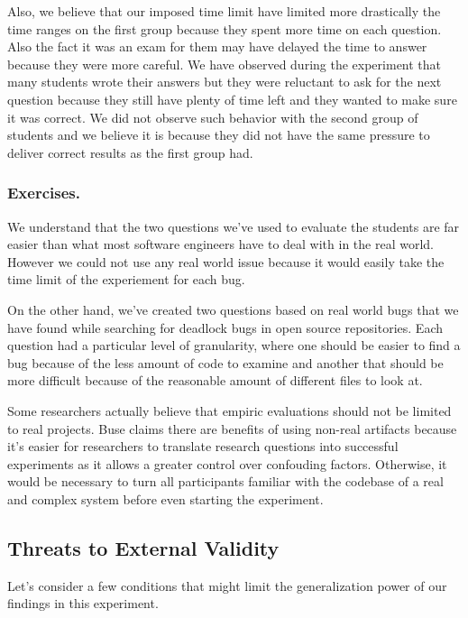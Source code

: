 Also, we believe that our imposed time limit have limited more drastically the time ranges on the first group because they spent more time on each question. Also the fact it was an exam for them may have delayed the time to answer because they were more careful. We have observed during the experiment that many students wrote their answers but they were reluctant to ask for the next question because they still have plenty of time left and they wanted to make sure it was correct. We did not observe such behavior with the second group of students and we believe it is because they did not have the same pressure to deliver correct results as the first group had.

\subsubsection{Exercises.}

We understand that the two questions we've used to evaluate the students are far easier than what most software engineers have to deal with in the real world. However we could not use any real world issue because it would easily take the time limit of the experiement for each bug.

On the other hand, we've created two questions based on real world bugs that we have found while searching for deadlock bugs in open source repositories. Each question had a particular level of granularity, where one should be easier to find a bug because of the less amount of code to examine and another that should be more difficult because of the reasonable amount of different files to look at.

Some researchers actually believe that empiric evaluations should not be limited to real projects. Buse claims there are benefits of using non-real artifacts \cite{buse} because it's easier for researchers to translate research questions into successful experiments as it allows a greater control over confouding factors. Otherwise, it would be necessary to turn all participants familiar with the codebase of a real and complex system before even starting the experiment. 

\subsection{Threats to External Validity}

Let's consider a few conditions that might limit the generalization power of our findings in this experiment.

